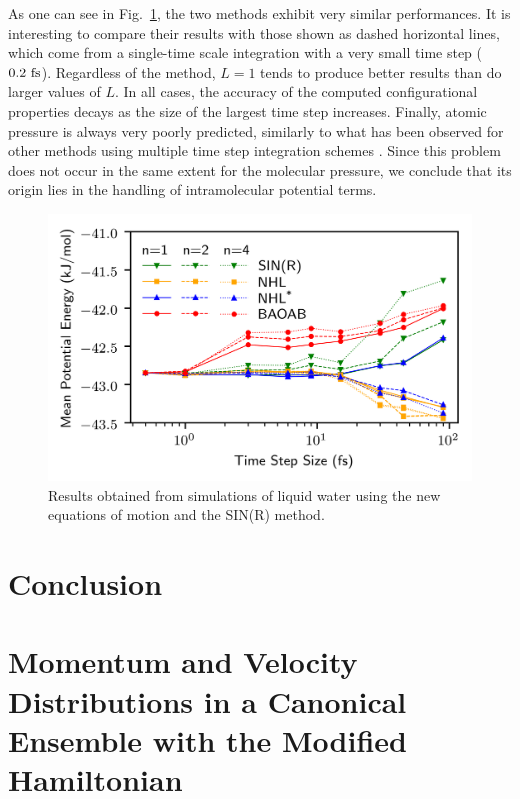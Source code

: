 \documentclass[
aip,
jcp,
reprint,
]{revtex4-1}
\begin{document}
As one can see in Fig.~\ref{fig:liquid water simulation results}, the two methods exhibit very similar performances.
It is interesting to compare their results with those shown as dashed horizontal lines, which come from a single-time scale integration with a very small time step ($0.2~{\rm fs}$).
Regardless of the method, $L=1$ tends to produce better results than do larger values of $L$.
In all cases, the accuracy of the computed configurational properties decays as the size of the largest time step increases.
Finally, atomic pressure is always very poorly predicted, similarly to what has been observed for other methods using multiple time step integration schemes \cite{Andoh_2017}.
Since this problem does not occur in the same extent for the molecular pressure, we conclude that its origin lies in the handling of intramolecular potential terms.

\begin{figure}
	\centering
	\includegraphics{water_potential_energy}
	\caption{Results obtained from simulations of liquid water using the new equations of motion and the SIN(R) method.}
	\label{fig:liquid water simulation results}
\end{figure}


\section{Conclusion}

\appendix

\section{Momentum and Velocity Distributions in a Canonical Ensemble with the Modified Hamiltonian}
\label{sec:momentum and velocity distributions}
\end{document}
